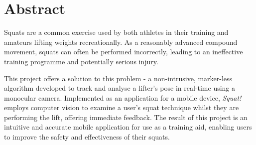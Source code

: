 \chapter*{Abstract}

Squats are a common exercise used by both athletes in their training and amateurs lifting weights recreationally. As a reasonably advanced compound movement, squats can often be performed incorrectly, leading to an ineffective training programme and potentially serious injury.

This project offers a solution to this problem - a non-intrusive, marker-less algorithm developed to track and analyse a lifter's pose in real-time using a monocular camera. Implemented as an application for a mobile device, \emph{Squat!} employs computer vision to examine a user's squat technique whilst they are performing the lift, offering immediate feedback. The result of this project is an intuitive and accurate mobile application for use as a training aid, enabling users to improve the safety and effectiveness of their squats.